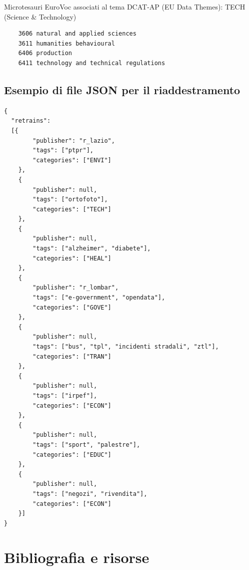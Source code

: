 \documentclass{article}
\theoremstyle{plain}
\theoremstyle{definition}
\begin{document}
Microtesauri EuroVoc associati al tema DCAT-AP (EU Data Themes): TECH (Science \& Technology)
\begin{verbatim}
    3606 natural and applied sciences 
    3611 humanities behavioural 
    6406 production 
    6411 technology and technical regulations
\end{verbatim}
\newpage
\subsection{Esempio di file JSON per il riaddestramento}
\begin{verbatim}
{
  "retrains": 
  [{
        "publisher": "r_lazio",
        "tags": ["ptpr"],
        "categories": ["ENVI"]
    },
    {
        "publisher": null,
        "tags": ["ortofoto"],
        "categories": ["TECH"]
    },
    {
        "publisher": null,
        "tags": ["alzheimer", "diabete"],
        "categories": ["HEAL"]
    },
    {
        "publisher": "r_lombar",
        "tags": ["e-government", "opendata"],
        "categories": ["GOVE"]
    },
    {
        "publisher": null,
        "tags": ["bus", "tpl", "incidenti stradali", "ztl"], 
        "categories": ["TRAN"]
    },
    {
        "publisher": null,
        "tags": ["irpef"],
        "categories": ["ECON"]
    },
    {
        "publisher": null,
        "tags": ["sport", "palestre"],
        "categories": ["EDUC"]
    },
    {
        "publisher": null,
        "tags": ["negozi", "rivendita"],
        "categories": ["ECON"]
    }]
}
\end{verbatim}

\newpage
\section{Bibliografia e risorse}
\end{document}
